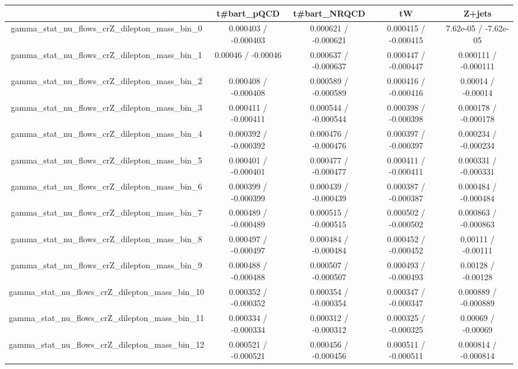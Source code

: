 \documentclass[10pt]{article}
\begin{document}
\begin{table}[htbp]
\begin{center}
\begin{tabular}{|c|c|c|c|c|}
\hline 
      & t#bar{t}_{pQCD}      & t#bar{t}_{NRQCD}      & tW      & Z+jets \\ 
\hline 
  gamma_stat_nu_flows_crZ_dilepton_mass_bin_0 & 0.000403 / -0.000403 & 0.000621 / -0.000621 & 0.000415 / -0.000415 & 7.62e-05 / -7.62e-05 \\ 
  gamma_stat_nu_flows_crZ_dilepton_mass_bin_1 & 0.00046 / -0.00046 & 0.000637 / -0.000637 & 0.000447 / -0.000447 & 0.000111 / -0.000111 \\ 
  gamma_stat_nu_flows_crZ_dilepton_mass_bin_2 & 0.000408 / -0.000408 & 0.000589 / -0.000589 & 0.000416 / -0.000416 & 0.00014 / -0.00014 \\ 
  gamma_stat_nu_flows_crZ_dilepton_mass_bin_3 & 0.000411 / -0.000411 & 0.000544 / -0.000544 & 0.000398 / -0.000398 & 0.000178 / -0.000178 \\ 
  gamma_stat_nu_flows_crZ_dilepton_mass_bin_4 & 0.000392 / -0.000392 & 0.000476 / -0.000476 & 0.000397 / -0.000397 & 0.000234 / -0.000234 \\ 
  gamma_stat_nu_flows_crZ_dilepton_mass_bin_5 & 0.000401 / -0.000401 & 0.000477 / -0.000477 & 0.000411 / -0.000411 & 0.000331 / -0.000331 \\ 
  gamma_stat_nu_flows_crZ_dilepton_mass_bin_6 & 0.000399 / -0.000399 & 0.000439 / -0.000439 & 0.000387 / -0.000387 & 0.000484 / -0.000484 \\ 
  gamma_stat_nu_flows_crZ_dilepton_mass_bin_7 & 0.000489 / -0.000489 & 0.000515 / -0.000515 & 0.000502 / -0.000502 & 0.000863 / -0.000863 \\ 
  gamma_stat_nu_flows_crZ_dilepton_mass_bin_8 & 0.000497 / -0.000497 & 0.000484 / -0.000484 & 0.000452 / -0.000452 & 0.00111 / -0.00111 \\ 
  gamma_stat_nu_flows_crZ_dilepton_mass_bin_9 & 0.000488 / -0.000488 & 0.000507 / -0.000507 & 0.000493 / -0.000493 & 0.00128 / -0.00128 \\ 
  gamma_stat_nu_flows_crZ_dilepton_mass_bin_10 & 0.000352 / -0.000352 & 0.000354 / -0.000354 & 0.000347 / -0.000347 & 0.000889 / -0.000889 \\ 
  gamma_stat_nu_flows_crZ_dilepton_mass_bin_11 & 0.000334 / -0.000334 & 0.000312 / -0.000312 & 0.000325 / -0.000325 & 0.00069 / -0.00069 \\ 
  gamma_stat_nu_flows_crZ_dilepton_mass_bin_12 & 0.000521 / -0.000521 & 0.000456 / -0.000456 & 0.000511 / -0.000511 & 0.000814 / -0.000814 \\ 

\end{tabular}
\end{center}
\end{table}
\end{document}
